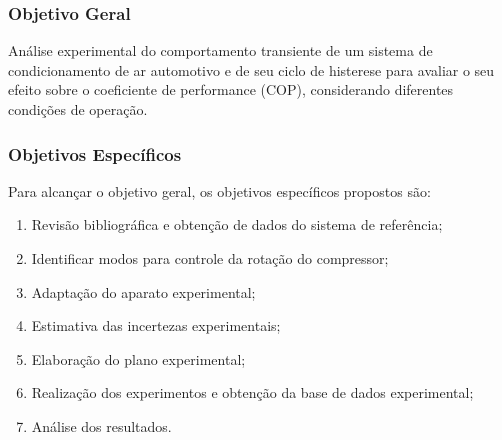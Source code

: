 \subsubsection{Objetivo Geral}

Análise experimental do comportamento transiente de um sistema de condicionamento de ar automotivo e de seu ciclo de histerese para avaliar o seu efeito sobre o coeficiente de performance (COP), considerando diferentes condições de operação.

\subsubsection{Objetivos Específicos}

Para alcançar o objetivo geral, os objetivos específicos propostos são:

\begin{enumerate}[label=\arabic*)]
    \item Revisão bibliográfica e obtenção de dados do sistema de referência;
    
    \item Identificar modos para controle da rotação do compressor;
    
    \item Adaptação do aparato experimental;
    
    \item Estimativa das incertezas experimentais;

    \item Elaboração do plano experimental;
    
    \item Realização dos experimentos e obtenção da base de dados experimental;
    
    \item Análise dos resultados.

\end{enumerate}

